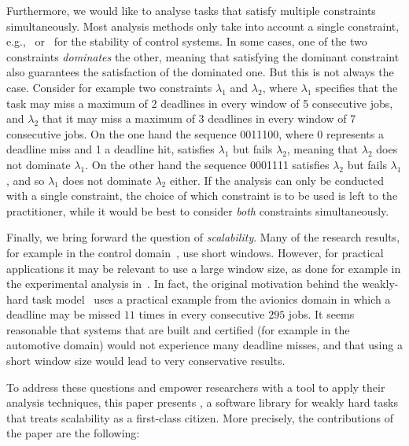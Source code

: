 Furthermore, we would like to analyse tasks that satisfy multiple constraints simultaneously.
Most analysis methods only take into account a single constraint, e.g.,~\cite{Pazzaglia:2018} or~\cite{Maggio:2020} for the stability of control systems.
In some cases, one of the two constraints \emph{dominates} the other, meaning that satisfying the dominant constraint also guarantees the satisfaction of the dominated one. 
But this is not always the case.
Consider for example two constraints $\lambda_1$ and $\lambda_2$, where $\lambda_1$ specifies that the task may miss a maximum of 2 deadlines in every window of 5 consecutive jobs, and $\lambda_2$ that it may miss a maximum of 3 deadlines in every window of 7 consecutive jobs.
On the one hand the sequence 0011100, where 0 represents a deadline miss and 1 a deadline hit, satisfies $\lambda_1$ but fails $\lambda_2$, meaning that $\lambda_2$ does not dominate $\lambda_1$.
On the other hand the sequence 0001111 satisfies $\lambda_2$ but fails $\lambda_1$, and so $\lambda_1$ does not dominate $\lambda_2$ either.
If the analysis can only be conducted with a single constraint, the choice of which constraint is to be used is left to the practitioner, while it would be best to consider \emph{both} constraints simultaneously.

Finally, we bring forward the question of \emph{scalability}. 
Many of the research results, for example in the control domain~\cite{Pazzaglia:2018, Linsenmayer:2017, Linsenmayer:2021}, use short windows. 
However, for practical applications it may be relevant to use a large window size, as done for example in the experimental analysis in~\cite{Behrouzian:2020}. 
In fact, the original motivation behind the weakly-hard task model~\cite{Bernat:2001} uses a practical example from the avionics domain in which a deadline may be missed $11$ times in every consecutive $295$ jobs. 
It seems reasonable that systems that are built and certified (for example in the automotive domain) would not experience many deadline misses, and that using a short window size would lead to very conservative results.

To address these questions and empower researchers with a tool to apply their analysis techniques, this paper presents \tool, a software library for weakly hard tasks that treats scalability as a first-class citizen. 
More precisely, the contributions of the paper are the following:

